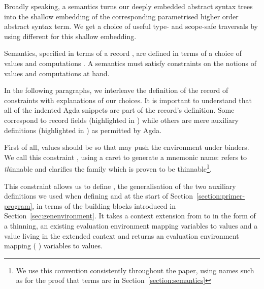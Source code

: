 \begin{agdasnippet}
\end{agdasnippet}

Broadly speaking, a semantics turns our deeply embedded abstract syntax
trees into the shallow embedding of the corresponding parametrised higher
order abstract syntax term. We get a choice of useful type- and scope-safe
traversals by using different  for this shallow embedding.

Semantics, specified in terms of a record \semrec{}, are defined in terms
of a choice of values  and computations . A semantics must
satisfy constraints on the notions of values  and computations 
at hand.

In the following paragraphs, we interleave the definition of the record
of constraints \semrec{} with explanations of our choices. It is important
to understand that all of the indented Agda snippets are part of the record's
definition. Some correspond to record fields (highlighted in )
while others are mere auxiliary definitions (highlighted in ) as
permitted by Agda.


\begin{agdasnippet}
\label{section:lamsem}
\end{agdasnippet}
First of all, values  should be  so that \semfun{} may push
the environment under binders.
We call this constraint ,
using a caret to generate a mnemonic name:  refers to \emph{th}innable
and  clarifies the family which is proven to be thinnable\footnote{
We use this convention consistently throughout the paper, using names
such as  for the proof that terms are
 in Section~\ref{section:semantics}}.

\begin{agdasnippet}
\addtolength{\leftskip}{\parindent}
\end{agdasnippet}
This constraint allows us to define , the generalisation of
the two auxiliary definitions we used when defining  and
 at the start of Section~\ref{section:primer-program}, in
terms of the building blocks introduced in
Section~\ref{sec:genenvironment}.  It takes a context extension from
 to  in the form of a thinning, an existing evaluation
environment mapping  variables to  values and a value
living in the extended context  and returns an evaluation
environment mapping ({  }) variables to 
values.

